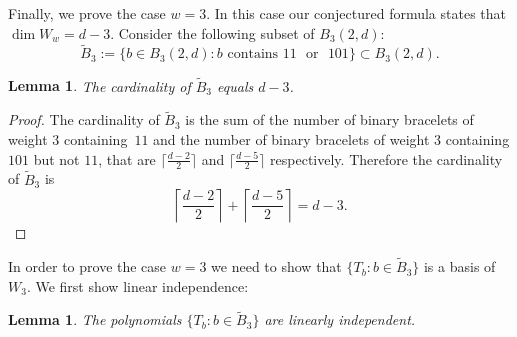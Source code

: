 \documentclass[10pt,a4paper]{amsart}
\numberwithin{equation}{section}
\newtheorem{Lemma}[Theorem]{Lemma}
\begin{document}
Finally, we prove the case $w=3$. In this case our conjectured formula states that $\dim W_w = d-3$. Consider the following subset of $B_3(2,d)$:
\begin{equation*}
		\tilde{B}_3:=\{b\in B_3(2,d)\colon b \text{ contains } 11 \text{ {or} } 101\}\subset B_3(2,d).
\end{equation*}
\begin{Lemma}
The cardinality of $\tilde{B}_3$ equals $d-3$.
\end{Lemma}
\begin{proof}
 The cardinality of $\tilde{B}_3$ is the sum of the number of binary bracelets of weight $3$ containing~$11$ and the number of binary bracelets of weight $3$ containing $101$ but not $11$, that are $\big\lceil \frac{d-2}{2}\big\rceil$ and $\big\lceil \frac{d-5}{2}\big\rceil$ respectively.
Therefore the cardinality of $\tilde{B}_3$ is
\[
\left\lceil \frac{d-2}{2}\right\rceil+\left\lceil \frac{d-5}{2}\right\rceil=d-3. \tag*{\qed}
\]	\renewcommand{\qed}{}
\end{proof}

In order to prove the case $w=3$ we need to show that $\big\{T_b\colon b\in \tilde{B}_3\big\}$ is a basis of $W_3$. We first show linear independence:
\begin{Lemma}\label{lemma:w3Indep}
The polynomials $\big\{T_b\colon b\in \tilde{B}_3\big\}$ are linearly independent.
\end{Lemma}
\end{document}
